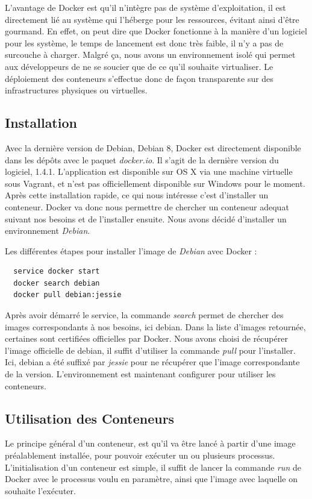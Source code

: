 \documentclass[12pt,a4paper]{article}
\begin{document}
L'avantage de Docker est qu'il n'intègre pas de système d'exploitation, il est directement lié au système qui l'héberge pour les ressources, évitant ainsi d'être gourmand. En effet, on peut dire que Docker fonctionne à la manière d'un logiciel pour les système, le temps de lancement est donc très faible, il n'y a pas de surcouche à charger. Malgré ça, nous avons un environnement isolé qui permet aux développeurs de ne se soucier que de ce qu'il souhaite virtualiser. Le déploiement des conteneurs s'effectue donc de façon transparente sur des infrastructures physiques ou virtuelles.

\subsection{Installation}
Avec la dernière version de Debian, Debian 8, Docker est directement disponible dans les dépôts avec le paquet \textit{docker.io}. Il s'agit de la dernière version du logiciel, 1.4.1. L'application est disponible sur OS X via une machine virtuelle sous Vagrant, et n'est pas officiellement disponible sur Windows pour le moment. Après cette installation rapide, ce qui nous intéresse c'est d'installer un conteneur. Docker va donc nous permettre de chercher un conteneur adequat suivant nos besoins et de l'installer ensuite. Nous avons décidé d'installer un environnement \textit{Debian}.

Les différentes étapes pour installer l'image de \textit{Debian} avec Docker :
\begin{lstlisting}
  service docker start
  docker search debian
  docker pull debian:jessie
\end{lstlisting}

Après avoir démarré le service, la commande \textit{search} permet de chercher des images correspondants à nos besoins, ici debian. Dans la liste d'images retournée, certaines sont certifiées officielles par Docker. Nous avons choisi de récupérer l'image officielle de debian, il suffit d'utiliser la commande \textit{pull} pour l'installer. Ici, debian a été suffixé par \textit{jessie} pour ne récupérer que l'image correspondante de la version. L'environnement est maintenant configurer pour utiliser les conteneurs.

\subsection{Utilisation des Conteneurs}

Le principe général d'un conteneur, est qu'il va être lancé à partir d'une image préalablement installée, pour pouvoir exécuter un ou plusieurs processus. L'initialisation d'un conteneur est simple, il suffit de lancer la commande \textit{run} de Docker avec le processus voulu en paramètre, ainsi que l'image avec laquelle on souhaite l'exécuter. 
\end{document}
